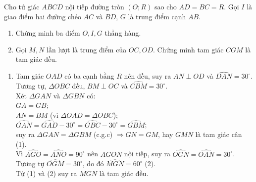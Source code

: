 \begin{ex}%
Cho tứ giác $ABCD$ nội tiếp đường tròn $(O;R)$ sao cho $AD=BC=R$. Gọi $I$ là giao điểm hai đường chéo $AC$ và $BD$, $G$ là trung điểm cạnh $AB$.
	\begin{enumerate} 
	\item Chứng minh ba điểm $O, I, G$ thẳng hàng.
	\item Gọi $M,N$ lần lượt là trung điểm của $OC, OD$. Chứng minh tam giác $CGM$ là tam giác đều.
\end{enumerate} 
	\loigiai
	{	
	\begin{enumerate}
		\item Tam giác $OAD$ có ba cạnh bằng $R$ nên đều, suy ra $AN\perp OD$ và $\widehat{DAN}=30^{\circ}$.\\
		Tương tự, $\Delta OBC$ đều, $BM\perp OC$ và $\widehat{CBM}=30^{\circ}$.\\
		Xét $\Delta GAN$ và $\Delta GBN$ có:\\
		$GA=GB$;\\
		$AN=BM$ (vì $\Delta OAD=\Delta OBC$);\\
		$\widehat{GAN}=\widehat{GAD}-30^{\circ}=\widehat{GBC}-30^{\circ}=\widehat{GBM}$;\\
		suy ra $\Delta GAN=\Delta GBM$ (c.g.c) $\Rightarrow GN=GM$, hay $GMN$ là tam giác cân \qquad (1).\\
		Vì $\widehat{AGO}=\widehat{ANO}= 90^{\circ}$ nên $AGON$ nội tiếp, suy ra $\widehat{OGN}=\widehat{OAN}= 30^{\circ}$.\\
		Tương tự $\widehat{OGM}= 30^{\circ}$, do đó $\widehat{MGN}= 60^{\circ}$ \qquad (2).\\
		Từ (1) và (2) suy ra $MGN$ là tam giác đều.
	\end{enumerate}
		}
\end{ex}

